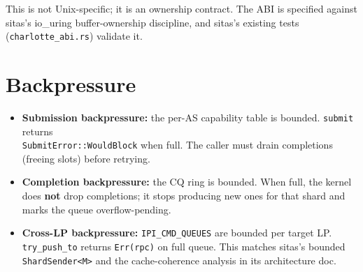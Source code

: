This is not Unix-specific; it is an ownership contract. The ABI is specified
against sitas's io\_uring buffer-ownership discipline, and sitas's existing
tests (\texttt{charlotte\_abi.rs}) validate it.

\section{Backpressure}

\begin{itemize}
    \item \textbf{Submission backpressure:} the per-AS capability table is
        bounded. \texttt{submit} returns \\ \texttt{SubmitError::WouldBlock} when
        full. The caller must drain completions (freeing slots) before
        retrying.
    \item \textbf{Completion backpressure:} the CQ ring is bounded. When full,
        the kernel does \textbf{not} drop completions; it stops producing new
        ones for that shard and marks the queue overflow-pending.
    \item \textbf{Cross-LP backpressure:} \texttt{IPI\_CMD\_QUEUES} are bounded
        per target LP. \texttt{try\_push\_to} returns \texttt{Err(rpc)} on full
        queue. This matches sitas's bounded \texttt{ShardSender<M>} and the
        cache-coherence analysis in its architecture doc.
\end{itemize}

\endinput
